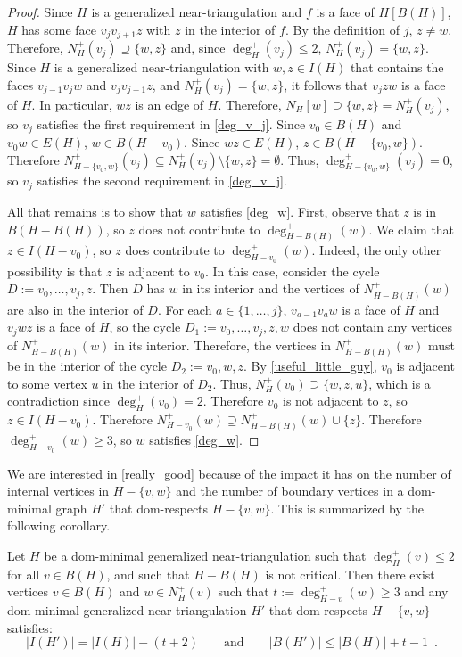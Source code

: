 \documentclass{patmorin}
\begin{document}
\begin{proof}
  Since $H$ is a generalized near-triangulation and $f$ is a face of $H[B(H)]$, $H$ has some face $v_j v_{j+1} z$ with $z$ in the interior of $f$.  By the definition of $j$, $z\neq w$.  Therefore, $N_H^+(v_j)\supseteq \{w,z\}$ and, since $\deg^+_H(v_j)\le 2$, $N_H^+(v_j)= \{w,z\}$.  Since $H$ is a generalized near-triangulation with $w,z\in I(H)$ that contains the faces $v_{j-1}v_j w$ and $v_{j}v_{j+1}z$, and $N_H^+(v_j)=\{w,z\}$, it follows that $v_jzw$ is a face of $H$.  In particular, $wz$ is an edge of $H$. Therefore, $N_H[w]\supseteq \{w,z\}=N^+_H(v_j)$, so $v_j$ satisfies the first requirement in \ref{deg_v_j}.  Since $v_0\in B(H)$ and $v_0w\in E(H)$, $w\in B(H-v_0)$.  Since $wz\in E(H)$, $z\in B(H-\{v_0,w\})$.  Therefore $N^+_{H-\{v_0,w\}}(v_j)\subseteq N^+_H(v_j)\setminus\{w,z\}=\emptyset$.  Thus, $\deg^+_{H-\{v_0,w\}}(v_j)=0$, so $v_j$ satisfies the second requirement in \ref{deg_v_j}.
  
  All that remains is to show that $w$ satisfies \ref{deg_w}.  First, observe that $z$ is in $B(H-B(H))$, so $z$ does not contribute to $\deg^+_{H-B(H)}(w)$. We claim that $z\in I(H-v_0)$, so $z$ does contribute to $\deg^+_{H-v_0}(w)$. Indeed, the only other possibility is that $z$ is adjacent to $v_0$.  In this case, consider the cycle $D:=v_0,\ldots,v_j,z$.  Then $D$ has $w$ in its interior and the vertices of $N^+_{H-B(H)}(w)$ are also in the interior of $D$. For each $a\in\{1,\ldots,j\}$, $v_{a-1}v_a w$ is a face of $H$ and $v_jwz$ is a face of $H$, so the cycle $D_1:=v_0,\ldots,v_j,z,w$ does not contain any vertices of $N^+_{H-B(H)}(w)$ in its interior.  Therefore, the vertices in $N^+_{H-B(H)}(w)$ must be in the interior of the cycle $D_2:=v_0,w,z$.  By \cref{useful_little_guy}, $v_0$ is adjacent to some vertex $u$ in the interior of $D_2$.  Thus, $N^+_H(v_0)\supseteq\{w,z,u\}$, which is a contradiction since $\deg^+_H(v_0)=2$.  Therefore $v_0$ is not adjacent to $z$, so $z\in I(H-v_0)$.  Therefore $N^+_{H-v_0}(w)\supseteq N^+_{H-B(H)}(w)\cup\{z\}$. Therefore $\deg^+_{H-v_0}(w)\ge 3$, so $w$ satisfies \ref{deg_w}.
\end{proof}

We are interested in \cref{really_good} because of the impact it has on the number of internal vertices in $H-\{v,w\}$ and the number of boundary vertices in a dom-minimal graph $H'$ that dom-respects $H-\{v,w\}$. This is summarized by the following corollary.


\begin{cor}\label{two_three_killer}
  Let $H$ be a dom-minimal generalized near-triangulation such that $\deg^+_H(v)\le 2$ for all $v\in B(H)$, and such that $H-B(H)$ is not critical. Then there exist vertices $v\in B(H)$ and $w\in N^+_H(v)$ such that $t:=\deg^+_{H-v}(w)\ge 3$ and any dom-minimal generalized near-triangulation $H'$ that dom-respects $H-\{v,w\}$ satisfies:
\[
  |I(H')|=|I(H)|-(t+2)
  \qquad\text{and}\qquad
  |B(H')|\le |B(H)|+t-1 \enspace .
\]
\end{cor}
\end{document}
